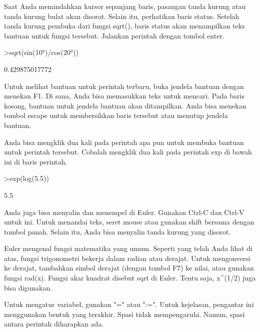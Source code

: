 \documentclass[a4paper,10pt]{article}
\begin{document}
\begin{eulernotebook}
\begin{eulercomment}
\begin{eulercomment}
\begin{eulercomment}
\begin{eulercomment}
\begin{eulercomment}
Saat Anda memindahkan kursor sepanjang baris, pasangan tanda kurung
atau tanda kurung bulat akan disorot. Selain itu, perhatikan baris
status. Setelah tanda kurung pembuka dari fungsi sqrt(), baris status
akan menampilkan teks bantuan untuk fungsi tersebut. Jalankan perintah
dengan tombol enter.
\end{eulercomment}
\begin{eulerprompt}
>sqrt(sin(10°)/cos(20°))
\end{eulerprompt}
\begin{euleroutput}
  0.429875017772
\end{euleroutput}
\begin{eulercomment}
Untuk melihat bantuan untuk perintah terbaru, buka jendela bantuan
dengan menekan F1. Di sana, Anda bisa memasukkan teks untuk mencari.
Pada baris kosong, bantuan untuk jendela bantuan akan ditampilkan.
Anda bisa menekan tombol escape untuk membersihkan baris tersebut atau
menutup jendela bantuan. 

Anda bisa mengklik dua kali pada perintah apa pun untuk membuka
bantuan untuk perintah tersebut. Cobalah mengklik dua kali pada
perintah exp di bawah ini di baris perintah.
\end{eulercomment}
\begin{eulerprompt}
>exp(log(5.5))
\end{eulerprompt}
\begin{euleroutput}
  5.5
\end{euleroutput}
\begin{eulercomment}
Anda juga bisa menyalin dan menempel di Euler. Gunakan Ctrl-C dan
Ctrl-V untuk ini. Untuk menandai teks, seret mouse atau gunakan shift
bersama dengan tombol panah. Selain itu, Anda bisa menyalin tanda
kurung yang disorot.
\end{eulercomment}
\begin{eulercomment}


\end{eulercomment}
\begin{eulercomment}
Euler mengenal fungsi matematika yang umum. Seperti yang telah Anda
lihat di atas, fungsi trigonometri bekerja dalam radian atau derajat.
Untuk mengonversi ke derajat, tambahkan simbol derajat (dengan tombol
F7) ke nilai, atau gunakan fungsi rad(x). Fungsi akar kuadrat disebut
sqrt di Euler. Tentu saja, x\textasciicircum{}(1/2) juga bisa digunakan. 

Untuk mengatur variabel, gunakan "=" atau ":=". Untuk kejelasan,
pengantar ini menggunakan bentuk yang terakhir. Spasi tidak
mempengaruhi. Namun, spasi antara perintah diharapkan ada. 


\end{eulercomment}
\end{eulercomment}
\end{eulercomment}
\end{eulercomment}
\end{eulercomment}
\end{eulernotebook}
\end{document}
